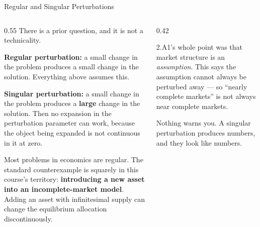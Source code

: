 \begin{frame}{Regular and Singular Perturbations}
\begin{columns}[T]
\begin{column}{0.55\textwidth}
\small
There is a prior question, and it is not a technicality.
\medskip

\textbf{Regular perturbation:} a small change in the problem produces a small change in the solution. Everything above assumes this.
\medskip

\textbf{Singular perturbation:} a small change in the problem produces a \textbf{large} change in the solution. Then no expansion in the perturbation parameter can work, because the object being expanded is not continuous in it at zero.
\medskip

Most problems in economics are regular. The standard counterexample is squarely in this course's territory: \textbf{introducing a new asset into an incomplete-market model}. Adding an asset with infinitesimal supply can change the equilibrium allocation discontinuously.
\end{column}
\begin{column}{0.42\textwidth}
\begin{cautionbox}[title=\textbf{Why this matters here}]\small
2.A1's whole point was that market structure is an \emph{assumption}. This says the assumption cannot always be perturbed away --- so ``nearly complete markets'' is not always near complete markets.
\end{cautionbox}
\medskip
\begin{examplebox}\footnotesize
Nothing warns you. A singular perturbation produces numbers, and they look like numbers.
\end{examplebox}
\end{column}
\end{columns}
\vspace{1mm}
\end{frame}

